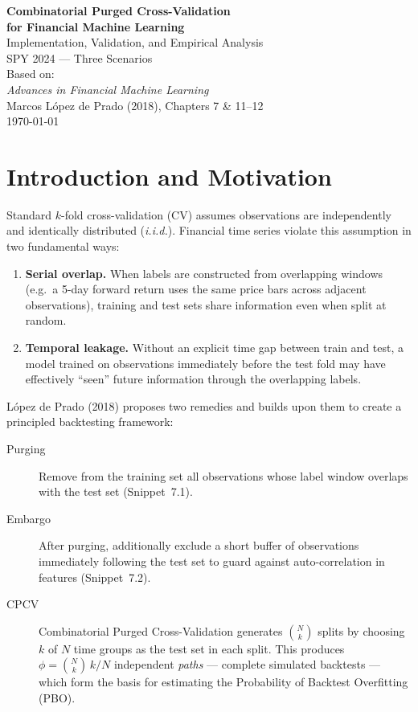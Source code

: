 \documentclass[11pt,a4paper]{article}
\begin{document}
\begin{titlepage}
  \centering
  \vspace*{3cm}
  {\Large\bfseries Combinatorial Purged Cross-Validation\\[0.4em]
  for Financial Machine Learning}\\[1.5em]
  {\large Implementation, Validation, and Empirical Analysis}\\[0.5em]
  {\large SPY 2024 — Three Scenarios}\\[3cm]
  {\normalsize
    Based on:\\[0.3em]
    \emph{Advances in Financial Machine Learning}\\
    Marcos L\'opez de Prado (2018), Chapters 7 \& 11--12
  }\\[3cm]
  {\normalsize\today}
  \vfill
\end{titlepage}

\tableofcontents
\newpage

\section{Introduction and Motivation}

Standard $k$-fold cross-validation (CV) assumes observations are
independently and identically distributed (\textit{i.i.d.}).  Financial time
series violate this assumption in two fundamental ways:

\begin{enumerate}
  \item \textbf{Serial overlap.} When labels are constructed from overlapping
    windows (e.g.\ a 5-day forward return uses the same price bars across
    adjacent observations), training and test sets share information even when
    split at random.
  \item \textbf{Temporal leakage.} Without an explicit time gap between train
    and test, a model trained on observations immediately before the test fold
    may have effectively ``seen'' future information through the overlapping
    labels.
\end{enumerate}

L\'opez de Prado (2018) proposes two remedies and builds upon them to create
a principled backtesting framework:

\begin{description}
  \item[Purging] Remove from the training set all observations whose label
    window overlaps with the test set (Snippet~7.1).
  \item[Embargo] After purging, additionally exclude a short buffer of
    observations immediately following the test set to guard against
    auto-correlation in features (Snippet~7.2).
  \item[CPCV] Combinatorial Purged Cross-Validation generates $\binom{N}{k}$
    splits by choosing $k$ of $N$ time groups as the test set in each split.
    This produces $\phi = \binom{N}{k}\,k/N$ independent \textit{paths} ---
    complete simulated backtests --- which form the basis for estimating the
    Probability of Backtest Overfitting (PBO).
\end{description}
\end{document}
